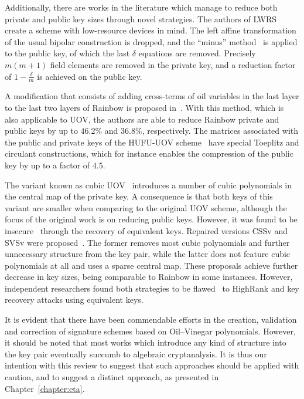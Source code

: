 \documentclass[12pt, a4paper, oneside]{memoir}
\theoremstyle{definition}
\begin{document}
Additionally, there are works in the literature which manage to reduce both private and public key sizes through novel strategies. The authors of LWRS~\cite{Zhang:201208} create a scheme with low-resource devices in mind. The left affine transformation of the usual bipolar construction is dropped, and the ``minus'' method~\cite[Subsection 3.2.1]{Wolf:200511} is applied to the public key, of which the last $\delta$ equations are removed. Precisely $m (m + 1)$ field elements are removed in the private key, and a reduction factor of $1 - \frac{\delta}{m}$ is achieved on the public key. 

A modification that consists of adding cross-terms of oil variables in the last layer to the last two layers of Rainbow is proposed in~\cite{Tan:201603}. With this method, which is also applicable to UOV, the authors are able to reduce Rainbow private and public keys by up to $46.2\%$ and $36.8\%$, respectively. The matrices associated with the public and private keys of the HUFU-UOV scheme~\cite{Tao:201905} have special Toeplitz and circulant constructions, which for instance enables the compression of the public key by up to a factor of $4.5$.

The variant known as cubic UOV~\cite{Nie:201511} introduces a number of cubic polynomials in the central map of the private key. A consequence is that both keys of this variant are smaller when comparing to the original UOV scheme, although the focus of the original work is on reducing public keys. However, it was found to be insecure~\cite{Hashimoto:201712} through the recovery of equivalent keys. Repaired versions CSSv and SVSv were proposed~\cite{Duong:201611}. The former removes most cubic polynomials and further unnecessary structure from the key pair, while the latter does not feature cubic polynomials at all and uses a sparse central map. These proposals achieve further decrease in key sizes, being comparable to Rainbow in some instances. However, independent researchers found both strategies to be flawed~\cite{Shim:201711,Hashimoto:201712} to HighRank and key recovery attacks using equivalent keys.

It is evident that there have been commendable efforts in the creation, validation and correction of signature schemes based on Oil--Vinegar polynomials. However, it should be noted that most works which introduce any kind of structure into the key pair eventually succumb to algebraic cryptanalysis. It is thus our intention with this review to suggest that such approaches should be applied with caution, and to suggest a distinct approach, as presented in Chapter~\ref{chapter:eta}.
\end{document}
